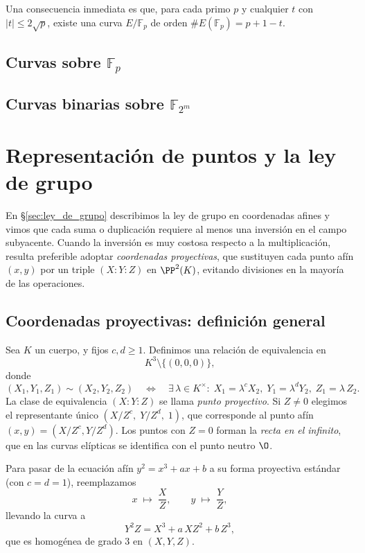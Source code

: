Una consecuencia inmediata es que, para cada primo \(p\) y cualquier \(t\) con \(|t|\le2\sqrt p\), existe una curva \(E/\mathbb{F}_p\) de orden \(\#E(\mathbb{F}_p)=p+1-t\).


\subsection{Curvas sobre \texorpdfstring{$\mathbb{F}_p$}{Fp}}\label{sec:curvas_sobre_cuerpos_finitos_primos}
\subsection{Curvas binarias sobre \texorpdfstring{$\mathbb{F}_{2^m}$}{F2m}}\label{sec:curvas_sobre_cuerpos_finitos_binarios}

\section{Representación de puntos y la ley de grupo}\label{sec:representacion_puntos}

En \S\ref{sec:ley_de_grupo} describimos la ley de grupo en coordenadas afines y vimos que cada suma o duplicación requiere al menos una inversión en el campo subyacente. Cuando la inversión es muy costosa respecto a la multiplicación, resulta preferible adoptar \emph{coordenadas proyectivas}, que sustituyen cada punto afín \((x,y)\) por un triple \((X:Y:Z)\) en \(\PP^2(K)\), evitando divisiones en la mayoría de las operaciones.

\subsection{Coordenadas proyectivas: definición general}

Sea \(K\) un cuerpo, y fijos \(c,d\ge1\). Definimos una relación de equivalencia en
\[
  K^3 \setminus \{(0,0,0)\},
\]
donde
\[
  (X_1,Y_1,Z_1)\sim (X_2,Y_2,Z_2)
  \quad\Longleftrightarrow\quad
  \exists\,\lambda\in K^\times:
    \;X_1=\lambda^cX_2,\;
    Y_1=\lambda^dY_2,\;
    Z_1=\lambda\,Z_2.
\]
La clase de equivalencia \((X:Y:Z)\) se llama \emph{punto proyectivo}. Si \(Z\neq0\) elegimos el representante único \((X/Z^c,\;Y/Z^d,\;1)\), que corresponde al punto afín \((x,y)=(X/Z^c,Y/Z^d)\). Los puntos con \(Z=0\) forman la \emph{recta en el infinito}, que en las curvas elípticas se identifica con el punto neutro \(\O\).

Para pasar de la ecuación afín \(y^2 = x^3 + ax + b\) a su forma proyectiva estándar (con \(c=d=1\)), reemplazamos
\[
  x\;\mapsto\;\frac{X}{Z},\qquad y\;\mapsto\;\frac{Y}{Z},
\]
llevando la curva a
\[
  Y^2Z = X^3 + a\,X Z^2 + b\,Z^3,
\]
que es homogénea de grado 3 en \((X,Y,Z)\).

